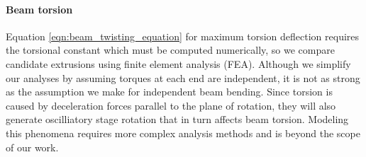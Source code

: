 \paragraph{Beam torsion} Equation \ref{eqn:beam_twisting_equation} for maximum torsion deflection requires the torsional constant which must be computed numerically, so we compare candidate extrusions using finite element analysis (FEA). Although we simplify our analyses by assuming torques at each end are independent, it is not as strong as the assumption we make for independent beam bending. Since torsion is caused by deceleration forces parallel to the plane of rotation, they will also generate oscilliatory stage rotation that in turn affects beam torsion. Modeling this phenomena requires more complex analysis methods and is beyond the scope of our work.

